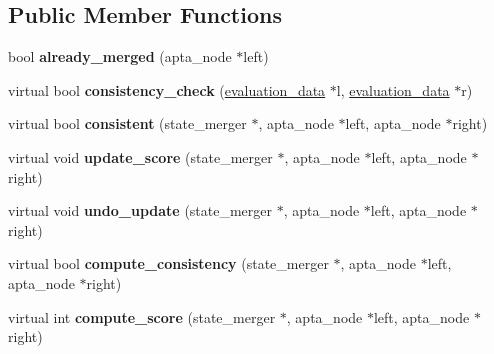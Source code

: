 \subsection*{Public Member Functions}
\begin{DoxyCompactItemize}
\item 
bool {\bfseries already\+\_\+merged} (apta\+\_\+node $\ast$left)\hypertarget{classevaluation__function_a66ed8b822b6cf90b37716edf50314886}{}\label{classevaluation__function_a66ed8b822b6cf90b37716edf50314886}

\item 
virtual bool {\bfseries consistency\+\_\+check} (\hyperlink{classevaluation__data}{evaluation\+\_\+data} $\ast$l, \hyperlink{classevaluation__data}{evaluation\+\_\+data} $\ast$r)\hypertarget{classevaluation__function_ac6a91c189027249847e00eab2b8bf52f}{}\label{classevaluation__function_ac6a91c189027249847e00eab2b8bf52f}

\item 
virtual bool {\bfseries consistent} (state\+\_\+merger $\ast$, apta\+\_\+node $\ast$left, apta\+\_\+node $\ast$right)\hypertarget{classevaluation__function_ac226c4fd2b73272b4ef7fa94f9a45744}{}\label{classevaluation__function_ac226c4fd2b73272b4ef7fa94f9a45744}

\item 
virtual void {\bfseries update\+\_\+score} (state\+\_\+merger $\ast$, apta\+\_\+node $\ast$left, apta\+\_\+node $\ast$right)\hypertarget{classevaluation__function_afabbf2a4ce4af020707fba03d171f75e}{}\label{classevaluation__function_afabbf2a4ce4af020707fba03d171f75e}

\item 
virtual void {\bfseries undo\+\_\+update} (state\+\_\+merger $\ast$, apta\+\_\+node $\ast$left, apta\+\_\+node $\ast$right)\hypertarget{classevaluation__function_ad0668d572e56e12c0ed267000391432a}{}\label{classevaluation__function_ad0668d572e56e12c0ed267000391432a}

\item 
virtual bool {\bfseries compute\+\_\+consistency} (state\+\_\+merger $\ast$, apta\+\_\+node $\ast$left, apta\+\_\+node $\ast$right)\hypertarget{classevaluation__function_a423a489d49a8156f60e2fce98d0fe525}{}\label{classevaluation__function_a423a489d49a8156f60e2fce98d0fe525}

\item 
virtual int {\bfseries compute\+\_\+score} (state\+\_\+merger $\ast$, apta\+\_\+node $\ast$left, apta\+\_\+node $\ast$right)\hypertarget{classevaluation__function_a36e533923cde5358ecb74ad40e46f1f9}{}\label{classevaluation__function_a36e533923cde5358ecb74ad40e46f1f9}


\end{DoxyCompactItemize}
